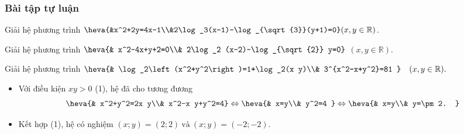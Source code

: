 \subsubsection{Bài tập tự luận}
\begin{bt}%
	Giải hệ phương trình $\heva{&x^2+2y=4x-1\\&2\log_3(x-1)-\log_{\sqrt{3}}(y+1)=0} (x,y\in \mathbb{R})$.	
\end{bt}
\begin{bt}%
	Giải hệ phương trình $\heva{& x^2-4x+y+2=0\\& 2\log_2 (x-2)-\log_{\sqrt{2}} y=0}$ $(x,y\in\mathbb{R})$.
\end{bt}
\begin{bt}%
	Giải hệ phương trình $\heva{&
		\log_2\left(x^2+y^2\right)=1+\log_2(x y)\\&
		3^{x^2-x+y^2}=81
	}\quad(x, y\in\mathbb{R}).$
	\loigiai
	{\begin{itemize}
			\item Với điều kiện $xy>0$ (1), hệ đã cho tương đương $$\heva{&
				x^2+y^2=2x y\\&
				x^2-x y+y^2=4}\Leftrightarrow\heva{&
				x=y\\&
				y^2=4
			}\Leftrightarrow\heva{&
				x=y\\&
				y=\pm 2.
			}$$
			\item Kết hợp (1), hệ có nghiệm $(x ; y)=(2 ; 2)\ \text{và}\ (x ; y)=(-2 ;-2)$.
		\end{itemize}
	}
\end{bt}
